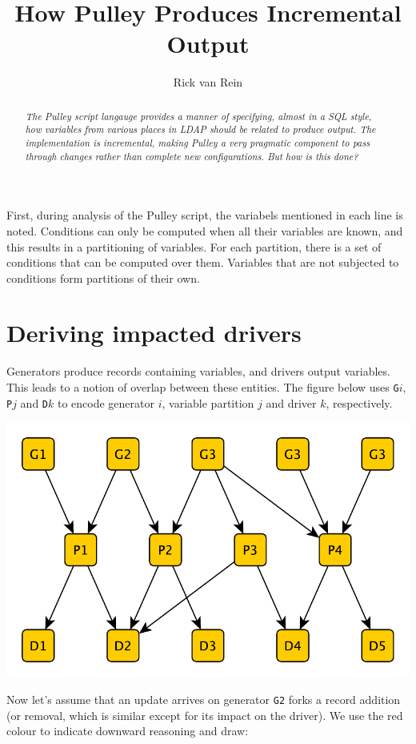 \documentclass[a4paper]{article}
\def\G#1{\texttt{G#1}\xspace}
\def\P#1{\texttt{P#1}\xspace}
\def\D#1{\texttt{D#1}\xspace}
\begin{document}
\title{How Pulley Produces Incremental Output}
\author{Rick van Rein}
\maketitle
\begin{abstract}\noindent\em
The Pulley script langauge provides a manner of specifying, almost in a SQL style, how variables from various places in LDAP should be related to produce output.  The implementation is incremental, making Pulley a very pragmatic component to pass through changes rather than complete new configurations.  But how is this done?
\end{abstract}

First, during analysis of the Pulley script, the variabels mentioned in each line is noted.  Conditions can only be computed when all their variables are known, and this results in a partitioning of variables.  For each partition, there is a set of conditions that can be computed over them.  Variables that are not subjected to conditions form partitions of their own.


\section{Deriving impacted drivers}

Generators produce records containing variables, and drivers output variables.  This leads to a notion of overlap between these entities.  The figure below uses \G{$i$}, \P{$j$} and \D{$k$} to encode generator $i$, variable partition $j$ and driver $k$, respectively.

\centerline{\includegraphics[scale=0.5]{img/network0-varoverlap.pdf}}

Now let's assume that an update arrives on generator \G2 forks a record addition (or removal, which is similar except for its impact on the driver).  We use the red colour to indicate downward reasoning and draw:
\end{document}
